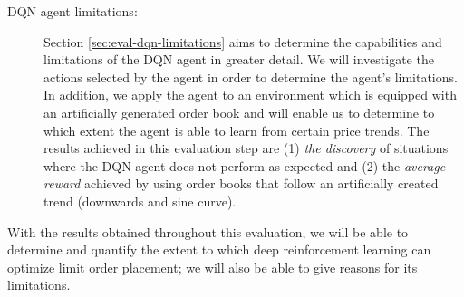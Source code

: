 \begin{description}
    \item[DQN agent limitations: ]
    Section \ref{sec:eval-dqn-limitations} aims to determine the capabilities and limitations of the DQN agent in greater detail.
    We will investigate the actions selected by the agent in order to determine the agent's limitations.
    In addition, we apply the agent to an environment which is equipped with an artificially generated order book and will enable us to determine to which extent the agent is able to learn from certain price trends.
    The results achieved in this evaluation step are (1) \textit{the discovery} of situations where the DQN agent does not perform as expected and (2) the \textit{average reward} achieved by using order books that follow an artificially created trend (downwards and sine curve).
\end{description}
With the results obtained throughout this evaluation, we will be able to determine and quantify the extent to which deep reinforcement learning can optimize limit order placement; we will also be able to give reasons for its limitations.

